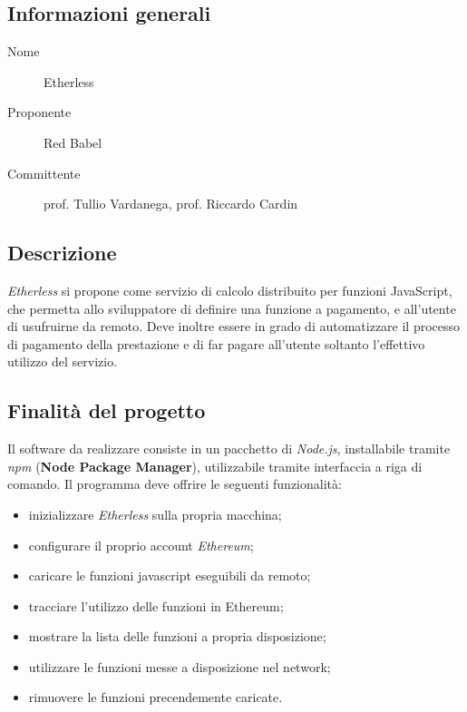 \documentclass[../studio-di-fattibilita.tex]{subfiles}
\begin{document}
  \subsection{Informazioni generali}%
  \label{subsec:informazioni_generali}
  \begin{description}
    \item[Nome] Etherless
    \item[Proponente] Red Babel
    \item[Committente] prof. Tullio Vardanega, prof. Riccardo Cardin
  \end{description}
  \subsection{Descrizione}%
  \label{subsec:descrizione}
  \textit{Etherless} si propone come servizio di calcolo distribuito per funzioni JavaScript, che permetta allo sviluppatore di definire una funzione a pagamento, e all'utente di usufruirne da remoto. Deve inoltre essere in grado di automatizzare il processo di pagamento della prestazione e di far pagare all'utente soltanto l'effettivo utilizzo del servizio.
  \subsection{Finalità del progetto}%
  \label{subsec:finalita_del_progetto}
  Il software da realizzare consiste in un pacchetto di \textit{Node.js}, installabile tramite \textit{npm} (\textbf{Node Package Manager}), utilizzabile tramite interfaccia a riga di comando.
  Il programma deve offrire le seguenti funzionalità:
  \begin{itemize}
    \item inizializzare \textit{Etherless} sulla propria macchina;
    \item configurare il proprio account \textit{Ethereum};
    \item caricare le funzioni javascript eseguibili da remoto;
    \item tracciare l'utilizzo delle funzioni in Ethereum;
    \item mostrare la lista delle funzioni a propria disposizione;
    \item utilizzare le funzioni messe a disposizione nel network;
    \item rimuovere le funzioni precendemente caricate.
  \end{itemize}
\end{document}
